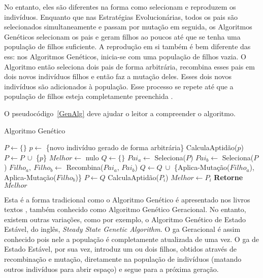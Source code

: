 No entanto, eles são diferentes na forma como selecionam e reproduzem os 
indivíduos. Enquanto que nas Estratégias Evolucionárias, todos os pais são 
selecionados simultaneamente e passam por mutação em seguida, os Algoritmos 
Genéticos selecionam os pais e geram filhos ao poucos até que se tenha uma 
população de filhos suficiente. A reprodução em si também é bem diferente das 
\acp{es}: nos Algoritmos Genéticos, inicia-se com uma população de filhos vazia. 
O Algoritmo então seleciona dois pais de forma arbitrária, recombina esses pais 
em dois novos indivíduos filhos e então faz a mutação deles. Esses dois novos 
indivíduos são adicionados à população. Esse processo se repete até que a 
população de filhos esteja completamente preenchida 
\citep{Luke2013Metaheuristics}.

O pseudocódigo~\ref{GenAlg} deve ajudar o leitor a compreender o algoritmo.

\begin{algorithm}                      %
	\caption{Algoritmo Genético}          %
	\label{GenAlg}                           %
	\begin{algorithmic}                    %
		\State $P \gets \{\} $
			\State $p \gets$ \{novo indivíduo gerado de forma arbitrária\}
			\State CalculaAptidão($p$)
			\State $P \gets P \ \cup $ \{$p$\} 
		\EndFor
		\State $Melhor \gets$ nulo
		\Repeat
			\State $Q \gets \{\}$
				\State $Pai_{a} \gets $ Seleciona($P$)
				\State $Pai_{b} \gets $ Seleciona($P$)
				\State $Filho_{a},\ Filho_{b} \gets $ Recombina($Pai_{a}$, $Pai_{b}$)
				\State $Q \gets Q\ \cup $ \{Aplica-Mutação($Filho_{a}$), Aplica-Mutação($Filho_{b}$)\}
			\EndFor
			\State $P \gets Q$
				\State CalculaAptidão($P_{i}$)
					\State $Melhor \gets P_{i}$
				\EndIf
			\EndFor
		\State \textbf{Retorne} $Melhor$
		\EndProcedure
	\end{algorithmic}
\end{algorithm}

Esta é a forma tradicional como o Algoritmo Genético é apresentado nos livros 
textos \citep{Luke2013Metaheuristics}, também conhecido como Algoritmo Genético 
Geracional. No entanto, existem outras variações, como por exemplo, o Algoritmo 
Genético de Estado Estável, do inglês, \textit{Steady State Genetic Algorithm}.
O \ac{ga} Geracional é assim conhecido pois nele a população é completamente 
atualizada de uma vez. O \ac{ga} de Estado Estável, por sua vez, introduz um 
ou dois filhos, obtidos através de recombinação e mutação, diretamente na 
população de indivíduos (matando outros indivíduos para abrir espaço) e segue 
para a próxima geração.

